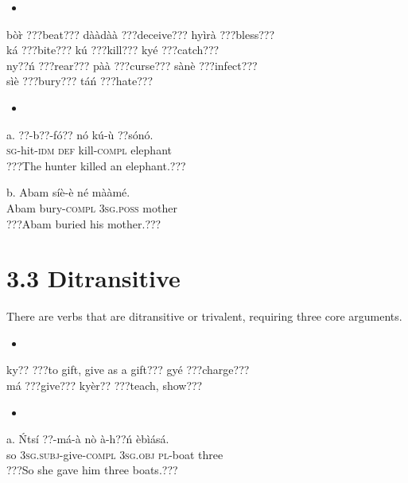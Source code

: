 \documentclass[output=paper]{langsci/langscibook}
\begin{document}
\begin{itemize}
\item \end{itemize}
\gll b\`{o}\`{r}   \textup{???beat???}    d\`{a}\`{a}d\`{a}\`{a}   \textup{???deceive???}  hy\`{i}r\`{a}   \textup{???bless???}    \\
\gll k\'{a}     \textup{???bite???}    k\'{u}     \textup{???kill???}    ky\'{e}   \textup{???catch???}\\
\gll ny??\'{n}   \textup{???rear???}    p\`{a}\`{a}     \textup{???curse???}    s\`{a}n\`{e}   \textup{???infect???}    \\
\gll s\`{i}\`{e}     \textup{???bury???}    t\'{a}\'{n}     \textup{???hate???}\\
\begin{itemize}
\item \end{itemize}
\gll a.  ??{}-b??-f\'{o}??  n\'{o}  k\'{u}-\`{u}     ??s\'{o}n\'{o}.\\
       \textsc{sg}{}-hit-\textsc{idm}  \textsc{def}  kill-\textsc{compl}  elephant\\
\glt   ???The hunter killed an elephant.???  
\z

\gll  b.  Abam  s\'{i}\`{e}-\`{e}     n\'{e}    m\`{a}\`{a}m\'{e}.\\
       Abam  bury-\textsc{compl}  \textsc{3sg.poss}  mother\\
\glt   ???Abam buried his mother.???
\z

\section{3.3  Ditransitive}

There are verbs that are ditransitive or trivalent, requiring three core arguments.

\begin{itemize}
\item \end{itemize}
\gll ky??   \textup{???to gift, give as a gift???  }  gy\'{e}   \textup{???charge???}\\
\gll m\'{a}     \textup{???give???}        ky\`{e}r??   \textup{???teach, show???}\\
\begin{itemize}
\item \end{itemize}
\gll a.  \'{N}ts\'{i}  ??{}-m\'{a}-\`{a}      n\`{o}    \`{a}-h??\'{n}    \`{e}b\`{i}\'{a}s\'{a}.  \\
       so  \textsc{3sg.subj}{}-give-\textsc{compl}  \textsc{3sg.obj}  \textsc{pl}{}-boat    three\\
\glt ???So she gave him three boats.??? \citep[8]{Martin1936}
\z
\end{document}
